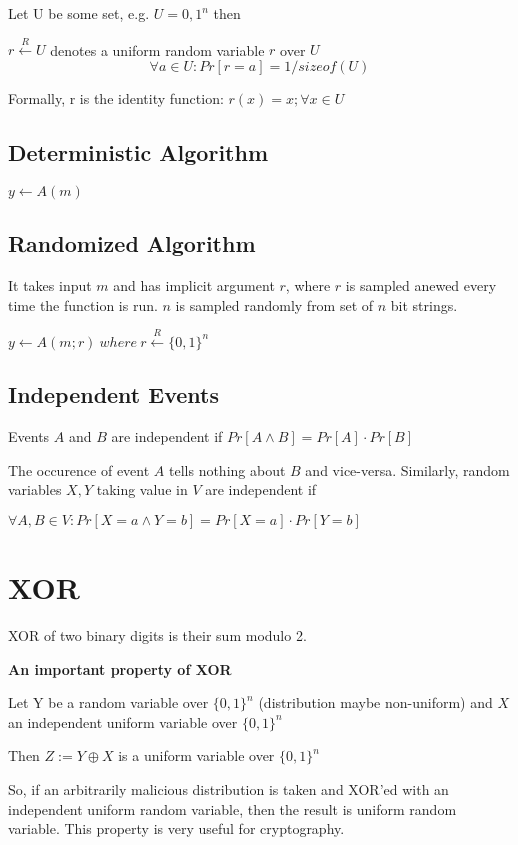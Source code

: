 \documentclass[a4paper, 12pt]{article}
\begin{document}
Let U be some set, e.g. $U = {0,1}^n$ then

$r \overset{R} \leftarrow U$ denotes a uniform random variable $r$ over $U$ $$\forall a \in U : Pr[r = a] = 1/sizeof(U)$$

Formally, r is the identity function: $r(x)=x; \forall x \in U$

\subsection{Deterministic Algorithm}

$y \leftarrow A(m)$

\subsection{Randomized Algorithm}

It takes input $m$ and has implicit argument $r$, where $r$ is sampled anewed every time the function is run. $n$ is sampled randomly from set of $n$ bit strings.

$y \leftarrow A(m; r) \ where \ r \overset{R} \leftarrow \{0, 1\}^n$

\subsection{Independent Events}

Events $A$ and $B$ are independent if $Pr[A \wedge B] = Pr[A] \cdot Pr[B]$

The occurence of event $A$ tells nothing about $B$ and vice-versa. Similarly, random variables $X, Y$ taking value in $V$ are independent if

$\forall A, B \in V: Pr[X=a \wedge Y=b] = Pr[X=a] \cdot Pr[Y=b]$


\section{XOR}

XOR of two binary digits is their sum modulo 2.

\textbf{An important property of XOR}

Let Y be a random variable over $\{0, 1\}^n$ (distribution maybe non-uniform) and $X$ an independent uniform variable over $\{0, 1\}^n$

Then $Z := Y \oplus X$ is a uniform variable over $\{0, 1\}^n$

So, if an arbitrarily malicious distribution is taken and XOR'ed with an independent uniform random variable, then the result is uniform random variable. This property is very useful for cryptography.
\end{document}
